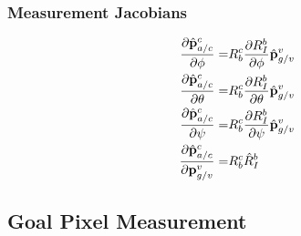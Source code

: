 \subsubsection{Measurement Jacobians}
\begin{align}
  \frac{\partial \hat{\boldsymbol{\mathrm{p}}}_{a/c}^c}{\partial \phi} =& R_b^c \frac{\partial
  R_I^b}{\partial \phi} \hat{\boldsymbol{\mathrm{p}}}_{g/v}^v \\
  \frac{\partial \hat{\boldsymbol{\mathrm{p}}}_{a/c}^c}{\partial \theta} =& R_b^c \frac{\partial
  R_I^b}{\partial \theta} \hat{\boldsymbol{\mathrm{p}}}_{g/v}^v \\
  \frac{\partial \hat{\boldsymbol{\mathrm{p}}}_{a/c}^c}{\partial \psi} =& R_b^c \frac{\partial
  R_I^b}{\partial \psi} \hat{\boldsymbol{\mathrm{p}}}_{g/v}^v \\
    \frac{\partial \hat{\boldsymbol{\mathrm{p}}}_{a/c}^c}{\partial \boldsymbol{\mathrm{p}}_{g/v}^v} =& R_b^c \hat{R}_I^b
\end{align}

\subsection{Goal Pixel Measurement}

